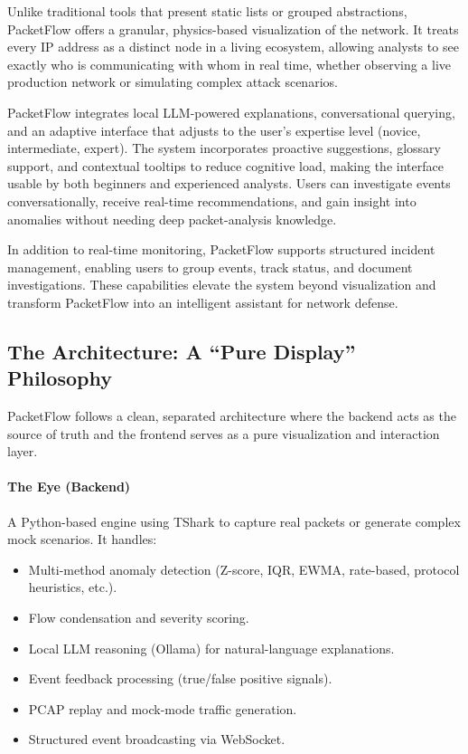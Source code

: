 \documentclass[
    11pt, 
    a4paper, 
    parskip=half, 
    headsepline,       %
    DIV=12             %
]{scrartcl}
\begin{document}
Unlike traditional tools that present static lists or grouped abstractions, PacketFlow offers a granular, physics-based visualization of the network. It treats every IP address as a distinct node in a living ecosystem, allowing analysts to see exactly who is communicating with whom in real time, whether observing a live production network or simulating complex attack scenarios.

PacketFlow integrates local LLM-powered explanations, conversational querying, and an adaptive interface that adjusts to the user's expertise level (novice, intermediate, expert). The system incorporates proactive suggestions, glossary support, and contextual tooltips to reduce cognitive load, making the interface usable by both beginners and experienced analysts. Users can investigate events conversationally, receive real-time recommendations, and gain insight into anomalies without needing deep packet-analysis knowledge.

In addition to real-time monitoring, PacketFlow supports structured incident management, enabling users to group events, track status, and document investigations. These capabilities elevate the system beyond visualization and transform PacketFlow into an intelligent assistant for network defense.

\subsection{The Architecture: A ``Pure Display'' Philosophy}
PacketFlow follows a clean, separated architecture where the backend acts as the source of truth and the frontend serves as a pure visualization and interaction layer.

\paragraph{The Eye (Backend)}
A Python-based engine using TShark to capture real packets or generate complex mock scenarios. It handles:
\begin{itemize}
    \item Multi-method anomaly detection (Z-score, IQR, EWMA, rate-based, protocol heuristics, etc.).
    \item Flow condensation and severity scoring.
    \item Local LLM reasoning (Ollama) for natural-language explanations.
    \item Event feedback processing (true/false positive signals).
    \item PCAP replay and mock-mode traffic generation.
    \item Structured event broadcasting via WebSocket.
\end{itemize}
\end{document}
